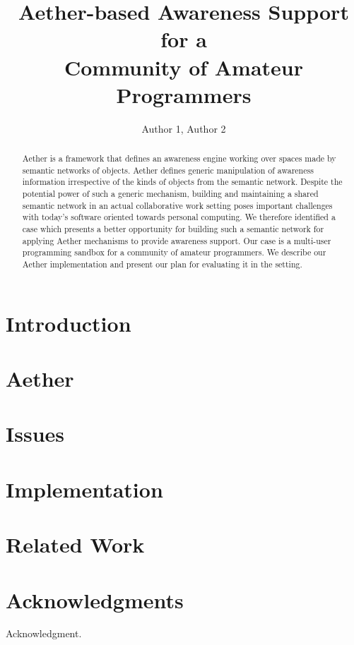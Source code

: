 \documentclass{ecscw2007}
\title{Aether-based Awareness Support for a\\Community of Amateur Programmers}
\author{Author 1, Author 2}
\affiliation{Institute 1, Country, Institute 2, Country}
\begin{document}
\maketitle
\thispagestyle{empty}


\begin{abstract}
Aether is a framework that defines an awareness engine working over spaces made by semantic networks of objects. Aether defines generic manipulation of awareness information irrespective of the kinds of objects from the semantic network. Despite the potential power of such a generic mechanism, building and maintaining a shared semantic network in an actual collaborative work setting poses important challenges with today's software oriented towards personal computing. We therefore identified a case which presents a better opportunity for building such a semantic network for applying Aether mechanisms to provide awareness support. Our case is a multi-user programming sandbox for a community of amateur programmers. We describe our Aether implementation and present our plan for evaluating it in the setting.
\end{abstract}

\section*{Introduction} 

\cite{Bowers91}

\section*{Aether} 

\section*{Issues} 

\section*{Implementation} 

\section*{Related Work} 





\section*{Acknowledgments} 

{\footnotesize Acknowledgment. }




  
\end{document}
